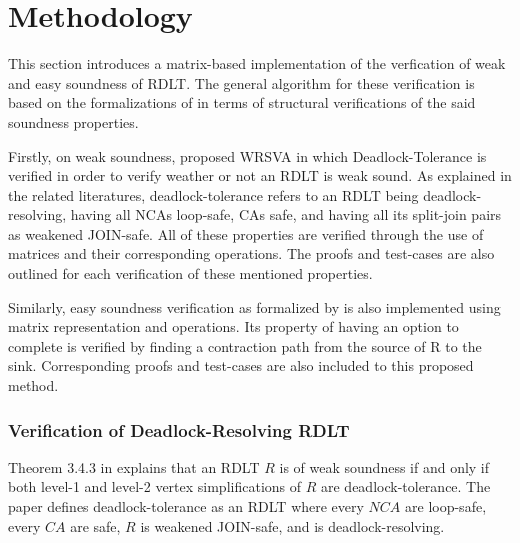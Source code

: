 \chapter{Methodology}

\begin{comment}
    Outline of the Methodology:
    - Introduction
    - Verification of Deadlock-Resolving RDLT
        - Contraction Path Generation (for identificaiton of deadlocks)
        - identification of escape contraction paths
        - Matrix-based algorithm for verification of Deadlock-Resolving RDLT
    - Loop-Safeness and Safeness Verification (Matrix-based)
    - Weakened JOIN-Safeness Verification (Matrix-based)
    - Weak Soundness of RDLT Verification (Matrix-based)
    - Easy Soundness of RDLT Verification (Matrix-based)

\end{comment}

This section introduces a matrix-based implementation of the verfication of weak and easy soundness of RDLT. The general algorithm for these verification is based on the formalizations of \cite{Ramirez2024} in terms of structural verifications of the said soundness properties. 

Firstly, on weak soundness, \cite{Ramirez2024} proposed WRSVA in which Deadlock-Tolerance is verified in order to verify weather or not an RDLT is weak sound. As explained in the related literatures, deadlock-tolerance refers to an RDLT being deadlock-resolving, having all NCAs loop-safe, CAs safe, and having all its split-join pairs as weakened JOIN-safe. All of these properties are verified through the use of matrices and their corresponding operations. The proofs and test-cases are also outlined for each verification of these mentioned properties. 

Similarly, easy soundness verification as formalized by \cite{Ramirez2024} is also implemented using matrix representation and operations. Its property of having an option to complete is verified by finding a contraction path from the source of R to the sink. Corresponding proofs and test-cases are also included to this proposed method. 

\subsection{Verification of Deadlock-Resolving RDLT}
Theorem 3.4.3 in \cite{Ramirez2024} explains that an RDLT $R$ is of weak soundness if and only if both level-1 and level-2 vertex simplifications of $R$ are deadlock-tolerance. The paper defines deadlock-tolerance as an RDLT where every $NCA$ are loop-safe, every $CA$ are safe, $R$ is weakened JOIN-safe, and is deadlock-resolving.

